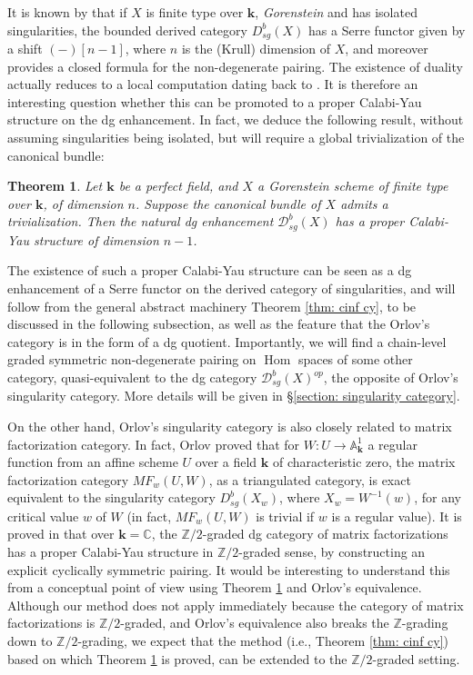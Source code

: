 \documentclass[11pt]{amsproc}
\newcommand{\Hom}{\operatorname{Hom}}
\def\Z{{\mathbb Z}}
\def\C{{\mathbb C}}
\def\K{{\mathbf{k}}}
\def\dd{\mathcal{D}}
\newtheorem{thm}[lem]{Theorem}
\theoremstyle{remark}
\numberwithin{equation}{section}
\begin{document}
It is known by \cite{murfet} that if $X$ is finite type over $\K$, {\it Gorenstein} and has isolated singularities,
the bounded derived category $D^{b}_{sg}(X)$ has a Serre functor given by a shift $(-)[n-1]$,
where $n$ is the (Krull) dimension of $X$,
and moreover provides a closed formula for the non-degenerate pairing.
The existence of duality actually reduces to a local computation dating back to \cite{auslander}.
It is therefore an interesting question whether this can be promoted to a proper Calabi-Yau structure on the dg enhancement.
In fact, we deduce the following result, without assuming singularities being isolated,
but will require a global trivialization of the canonical bundle:

\begin{thm}\label{thm: sing cy}
Let $\K$ be a perfect field,
and $X$ a Gorenstein scheme of finite type over $\K$, of dimension $n$.
Suppose the canonical bundle of $X$ admits a trivialization. 
Then the natural dg enhancement $\dd^{b}_{sg}(X)$ has a proper Calabi-Yau structure of dimension $n-1$.
\end{thm}

The existence of such a proper Calabi-Yau structure can be seen as a dg enhancement of a Serre functor on the derived category of singularities,
and will follow from the general abstract machinery Theorem \ref{thm: cinf cy},
to be discussed in the following subsection,
as well as the feature that the Orlov's category is in the form of a dg quotient.
Importantly, we will find a chain-level graded symmetric non-degenerate pairing on $\Hom$ spaces of some other category,
quasi-equivalent to the dg category $\dd^{b}_{sg}(X)^{op}$, 
the opposite of Orlov's singularity category.
More details will be given in \S\ref{section: singularity category}.

On the other hand, Orlov's singularity category is also closely related to matrix factorization category.
In fact, Orlov \cite{orlov} proved that for $W: U \to \mathbb{A}^{1}_{\K}$ a regular function from an affine scheme $U$ over a field $\K$ of characteristic zero,
the matrix factorization category $MF_{w}(U, W)$,
as a triangulated category,
is exact equivalent to the singularity category $D^{b}_{sg}(X_{w})$,
where $X_{w} = W^{-1}(w)$,
for any critical value $w$ of $W$ (in fact, $MF_{w}(U, W)$ is trivial if $w$ is a regular value).
It is proved in \cite{shklyarov_mf} that over $\K = \C$,
the $\Z/2$-graded dg category of matrix factorizations has a proper Calabi-Yau structure in $\Z/2$-graded sense,
by constructing an explicit cyclically symmetric pairing.
It would be interesting to understand this from a conceptual point of view using Theorem \ref{thm: sing cy} and Orlov's equivalence.
Although our method does not apply immediately because the category of matrix factorizations is $\Z/2$-graded,
and Orlov's equivalence also breaks the $\Z$-grading down to $\Z/2$-grading,
we expect that the method (i.e., Theorem \ref{thm: cinf cy}) based on which Theorem \ref{thm: sing cy} is proved,
can be extended to the $\Z/2$-graded setting.
\end{document}
